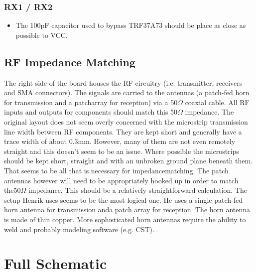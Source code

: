 \documentclass{default}
\begin{document}
\subsection{RX1 / RX2}

\begin{itemize}
\item The 100pF capacitor used to bypass TRF37A73 should be place as close as possible to VCC.
\end{itemize}

\section{RF Impedance Matching}

The right side of the board houses the RF circuitry (i.e. transmitter, receivers and SMA
connectors). The signals are carried to the antennas (a patch-fed horn for transmission and a
patcharray for reception) via a 50$\si{\Omega}$ coaxial cable. All RF inputs and outputs for
components should match this 50$\si{\Omega}$ impedance. The original layout does not seem overly
concerned with the microstrip transmission line width between RF components. They are kept short and
generally have a trace width of about 0.3mm. However, many of them are not even remotely straight
and this doesn't seem to be an issue. Where possible the microstrips should be kept short, straight
and with an unbroken ground plane beneath them. That seems to be all that is necessary for
impedancematching. The patch antennas however will need to be appropriately hooked up in order to
match the50$\si{\Omega}$ impedance. This should be a relatively straightforward calculation. The
setup Henrik uses seems to be the most logical one. He uses a single patch-fed horn antenna for
transmission anda patch array for reception. The horn antenna is made of thin copper. More
sophisticated horn antennas require the ability to weld and probably modeling software (e.g. CST).

\chapter{Full Schematic}
\label{cha:schematic}


\end{document}
